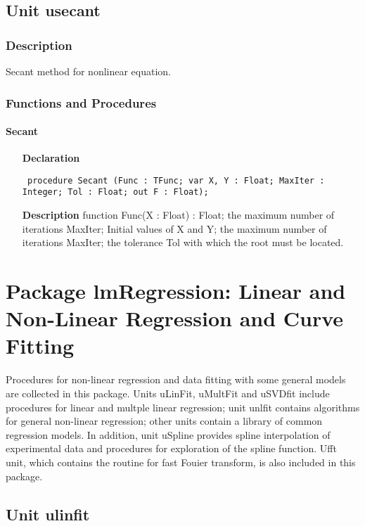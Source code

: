 \documentclass[12pt,a4paper,oneside]{report}
\newcommand{\declarationitem}[1]{\textbf{#1}}
\newcommand{\descriptiontitle}[1]{\textbf{#1}}
\newcommand{\code}[1]{\texttt{#1}}
\begin{document}
\section{Unit usecant}
\label{usecant}
\subsection{Description}
Secant method for nonlinear equation.
\subsection{Functions and Procedures}
\subsubsection{Secant}
\label{usecant-Secant}
\begin{itemize}\item[\declarationitem{Declaration}\hfill]
	\begin{flushleft}
		\code{
			procedure Secant (Func : TFunc; var X, Y : Float; MaxIter : Integer; Tol : Float; out F : Float);}
	\end{flushleft}
	\item[\descriptiontitle{Description}]
	function Func(X : Float) : Float; the maximum number of iterations MaxIter; Initial values of X and Y; the maximum number of iterations MaxIter; the tolerance Tol with which the root must be located.
	
\end{itemize}
\chapter[Package lmRegression]{Package lmRegression: Linear and Non-Linear Regression and Curve Fitting}\label{package-lmRegression}
Procedures for non-linear regression and data fitting with some general models are collected in this package. Units uLinFit, uMultFit and uSVDfit include procedures for linear and multple linear regression; unit unlfit contains algorithms for general non-linear regression; other units contain a library of common regression models. In addition, unit uSpline provides spline interpolation of experimental data and procedures for exploration of the spline function. Ufft unit, which contains the routine for fast Fouier transform, is also included in this package. 

\section{Unit ulinfit}
\label{ulinfit}
\end{document}
